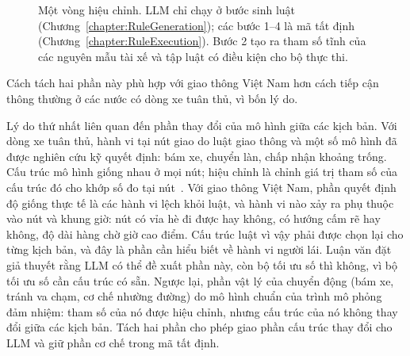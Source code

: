 \documentclass[../main.tex]{subfiles}
\begin{document}
\begin{figure}[!htbp]
\centering
{}
\caption{Một vòng hiệu chỉnh. LLM chỉ chạy ở bước sinh luật (Chương~\ref{chapter:RuleGeneration}); các bước 1--4 là mã tất định (Chương~\ref{chapter:RuleExecution}). Bước 2 tạo ra tham số tĩnh của các nguyên mẫu tài xế và tập luật có điều kiện cho bộ thực thi.}
\label{fig:1.1}
\end{figure}

Cách tách hai phần này phù hợp với giao thông Việt Nam hơn cách tiếp cận thông thường ở các nước có dòng xe tuân thủ, vì bốn lý do.

Lý do thứ nhất liên quan đến phần thay đổi của mô hình giữa các kịch bản. Với dòng xe tuân thủ, hành vi tại nút giao do luật giao thông và một số mô hình đã được nghiên cứu kỹ quyết định: bám xe, chuyển làn, chấp nhận khoảng trống. Cấu trúc mô hình giống nhau ở mọi nút; hiệu chỉnh là chỉnh giá trị tham số của cấu trúc đó cho khớp số đo tại nút~\cite{hollander2008calibration}. Với giao thông Việt Nam, phần quyết định độ giống thực tế là các hành vi lệch khỏi luật, và hành vi nào xảy ra phụ thuộc vào nút và khung giờ: nút có vỉa hè đi được hay không, có hướng cấm rẽ hay không, độ dài hàng chờ giờ cao điểm. Cấu trúc luật vì vậy phải được chọn lại cho từng kịch bản, và đây là phần cần hiểu biết về hành vi người lái. Luận văn đặt giả thuyết rằng LLM có thể đề xuất phần này, còn bộ tối ưu số thì không, vì bộ tối ưu số cần cấu trúc có sẵn. Ngược lại, phần vật lý của chuyển động (bám xe, tránh va chạm, cơ chế nhường đường) do mô hình chuẩn của trình mô phỏng đảm nhiệm: tham số của nó được hiệu chỉnh, nhưng cấu trúc của nó không thay đổi giữa các kịch bản. Tách hai phần cho phép giao phần cấu trúc thay đổi cho LLM và giữ phần cơ chế trong mã tất định.
\end{document}
